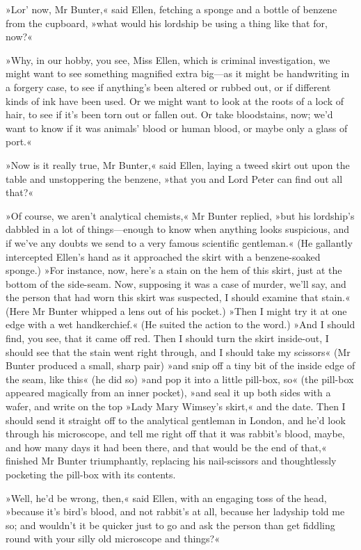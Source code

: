 »Lor' now, Mr Bunter,« said Ellen, fetching a sponge and a bottle of benzene from the cupboard, »what would his lordship be using a thing like that for, now?«

»Why, in our hobby, you see, Miss Ellen, which is criminal investigation, we might want to see something magnified extra big\allowbreak---\allowbreak as it might be handwriting in a forgery case, to see if anything's been altered or rubbed out, or if different kinds of ink have been used. Or we might want to look at the roots of a lock of hair, to see if it's been torn out or fallen out. Or take bloodstains, now; we'd want to know if it was animals' blood or human blood, or maybe only a glass of port.«

»Now is it really true, Mr Bunter,« said Ellen, laying a tweed skirt out upon the table and unstoppering the benzene, »that you and Lord Peter can find out all that?«

»Of course, we aren't analytical chemists,« Mr Bunter replied, »but his lordship's dabbled in a lot of things\allowbreak---\allowbreak enough to know when anything looks suspicious, and if we've any doubts we send to a very famous scientific gentleman.« (He gallantly intercepted Ellen's hand as it approached the skirt with a benzene-soaked sponge.) »For instance, now, here's a stain on the hem of this skirt, just at the bottom of the side-seam. Now, supposing it was a case of murder, we'll say, and the person that had worn this skirt was suspected, I should examine that stain.« (Here Mr Bunter whipped a lens out of his pocket.) »Then I might try it at one edge with a wet handkerchief.« (He suited the action to the word.) »And I should find, you see, that it came off red.  Then I should turn the skirt inside-out, I should see that the stain went right through, and I should take my scissors« (Mr Bunter produced a small, sharp pair) »and snip off a tiny bit of the inside edge of the seam, like this« (he did so) »and pop it into a little pill-box, so« (the pill-box appeared magically from an inner pocket), »and seal it up both sides with a wafer, and write on the top »Lady Mary Wimsey's skirt,« and the date. Then I should send it straight off to the analytical gentleman in London, and he'd look through his microscope, and tell me right off that it was rabbit's blood, maybe, and how many days it had been there, and that would be the end of that,« finished Mr Bunter triumphantly, replacing his nail-scissors and thoughtlessly pocketing the pill-box with its contents.

»Well, he'd be wrong, then,« said Ellen, with an engaging toss of the head, »because it's bird's blood, and not rabbit's at all, because her ladyship told me so; and wouldn't it be quicker just to go and ask the person than get fiddling round with your silly old microscope and things?«

